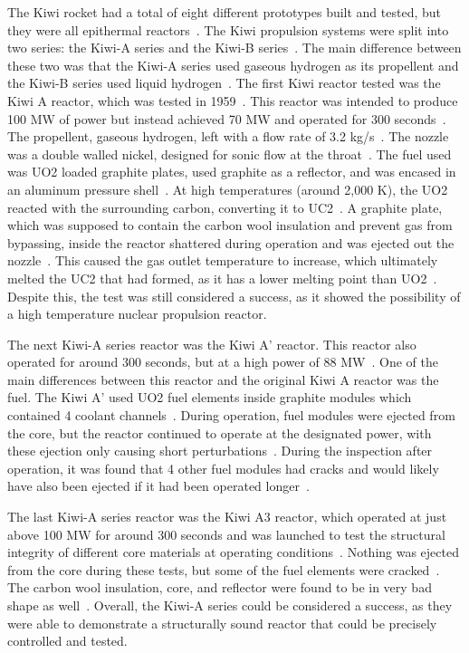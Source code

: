 \documentclass{article}
\begin{document}
The Kiwi rocket had a total of eight different prototypes built and tested, but they were all epithermal reactors~\cite{finseth1991rover}. The Kiwi propulsion systems were split into two series: the Kiwi-A series and the Kiwi-B series~\cite{house1964development}. The main difference between these two was that the Kiwi-A series used gaseous hydrogen as its propellent and the Kiwi-B series used liquid hydrogen~\cite{house1964development}. The first Kiwi reactor tested was the Kiwi A reactor, which was tested in 1959~\cite{finseth1991rover}. This reactor was intended to produce 100 MW of power but instead achieved 70 MW and operated for 300 seconds~\cite{gerrish2014nuclear}. The propellent, gaseous hydrogen, left with a flow rate of 3.2 kg/s~\cite{finseth1991rover}. The nozzle was a double walled nickel, designed for sonic flow at the throat~\cite{finseth1991rover}. The fuel used was UO2 loaded graphite plates, used graphite as a reflector, and was encased in an aluminum pressure shell~\cite{finseth1991rover}. At high temperatures (around 2,000 K), the UO2 reacted with the surrounding carbon, converting it to UC2~\cite{finseth1991rover}. A graphite plate, which was supposed to contain the carbon wool insulation and prevent gas from bypassing, inside the reactor shattered during operation and was ejected out the nozzle~\cite{finseth1991rover}. This caused the gas outlet temperature to increase, which ultimately melted the UC2 that had formed, as it has a lower melting point than UO2~\cite{finseth1991rover}. Despite this, the test was still considered a success, as it showed the possibility of a high temperature nuclear propulsion reactor. 


The next Kiwi-A series reactor was the Kiwi A' reactor. This reactor also operated for around 300 seconds, but at a high power of 88 MW~\cite{gerrish2014nuclear}. One of the main differences between this reactor and the original Kiwi A reactor was the fuel. The Kiwi A' used UO2 fuel elements inside graphite modules which contained 4 coolant channels~\cite{finseth1991rover}. During operation, fuel modules were ejected from the core, but the reactor continued to operate at the designated power, with these ejection only causing short perturbations~\cite{finseth1991rover}. During the inspection after operation, it was found that 4 other fuel modules had cracks and would likely have also been ejected if it had been operated longer~\cite{finseth1991rover}. 

The last Kiwi-A series reactor was the Kiwi A3 reactor, which operated at just above 100 MW for around 300 seconds and was launched to test the structural integrity of different core materials at operating conditions~\cite{gerrish2014nuclear}. Nothing was ejected from the core during these tests, but some of the fuel elements were cracked~\cite{finseth1991rover}. The carbon wool insulation, core, and reflector were found to be in very bad shape as well~\cite{finseth1991rover}. Overall, the Kiwi-A series could be considered a success, as they were able to demonstrate a structurally sound reactor that could be precisely controlled and tested. 
\end{document}
